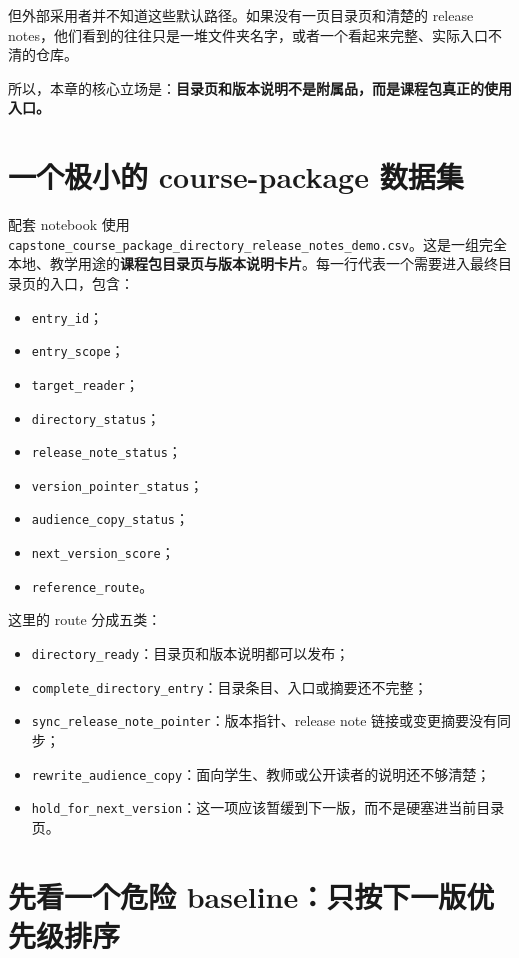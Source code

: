 但外部采用者并不知道这些默认路径。如果没有一页目录页和清楚的 release notes，他们看到的往往只是一堆文件夹名字，或者一个看起来完整、实际入口不清的仓库。

所以，本章的核心立场是：\textbf{目录页和版本说明不是附属品，而是课程包真正的使用入口。}

\section{一个极小的 course-package 数据集}

配套 notebook 使用 \nolinkurl{capstone_course_package_directory_release_notes_demo.csv}。这是一组完全本地、教学用途的\textbf{课程包目录页与版本说明卡片}。每一行代表一个需要进入最终目录页的入口，包含：

\begin{itemize}
    \item \texttt{entry\_id}；
    \item \texttt{entry\_scope}；
    \item \texttt{target\_reader}；
    \item \texttt{directory\_status}；
    \item \texttt{release\_note\_status}；
    \item \texttt{version\_pointer\_status}；
    \item \texttt{audience\_copy\_status}；
    \item \texttt{next\_version\_score}；
    \item \texttt{reference\_route}。
\end{itemize}

这里的 route 分成五类：

\begin{itemize}
    \item \texttt{directory\_ready}：目录页和版本说明都可以发布；
    \item \texttt{complete\_directory\_entry}：目录条目、入口或摘要还不完整；
    \item \texttt{sync\_release\_note\_pointer}：版本指针、release note 链接或变更摘要没有同步；
    \item \texttt{rewrite\_audience\_copy}：面向学生、教师或公开读者的说明还不够清楚；
    \item \texttt{hold\_for\_next\_version}：这一项应该暂缓到下一版，而不是硬塞进当前目录页。
\end{itemize}

\section{先看一个危险 baseline：只按下一版优先级排序}

